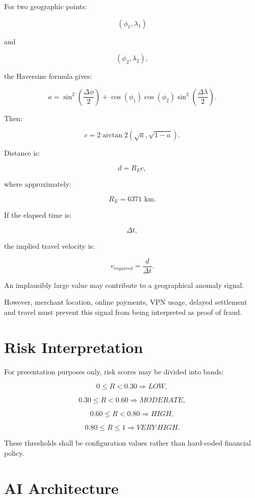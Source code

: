 \documentclass[11pt,a4paper]{article}
\begin{document}
For two geographic points:

\[
(\phi_1,\lambda_1)
\]

and

\[
(\phi_2,\lambda_2),
\]

the Haversine formula gives:

\[
a
=
\sin^2
\left(
\frac{\Delta\phi}{2}
\right)
+
\cos(\phi_1)
\cos(\phi_2)
\sin^2
\left(
\frac{\Delta\lambda}{2}
\right).
\]

Then:

\[
c
=
2
\arctan2
\left(
\sqrt{a},
\sqrt{1-a}
\right).
\]

Distance is:

\[
d=R_Ec,
\]

where approximately:

\[
R_E=6371\text{ km}.
\]

If the elapsed time is:

\[
\Delta t,
\]

the implied travel velocity is:

\[
v_{required}
=
\frac{d}{\Delta t}.
\]

An implausibly large value may contribute to a geographical anomaly
signal.

However, merchant location, online payments, VPN usage, delayed
settlement and travel must prevent this signal from being interpreted
as proof of fraud.

\section{Risk Interpretation}

For presentation purposes only, risk scores may be divided into
bands:

\[
0\leq R<0.30
\Rightarrow LOW,
\]

\[
0.30\leq R<0.60
\Rightarrow MODERATE,
\]

\[
0.60\leq R<0.80
\Rightarrow HIGH,
\]

\[
0.80\leq R\leq1
\Rightarrow VERY\ HIGH.
\]

These thresholds shall be configuration values rather than hard-coded
financial policy.

\section{AI Architecture}
\end{document}
